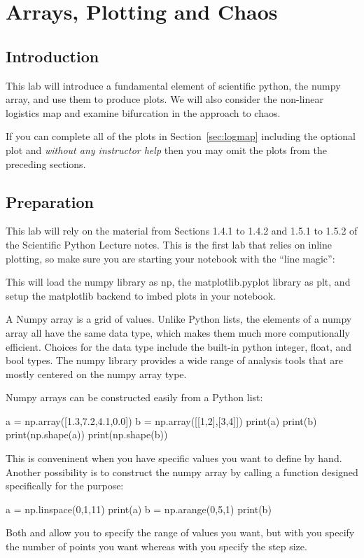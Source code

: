 \chapter{Arrays, Plotting and Chaos}

\section{Introduction}

This lab will introduce a fundamental element of scientific python,
the numpy array, and use them to produce plots.  We will also consider
the non-linear logistics map and examine bifurcation in the approach
to chaos.

If you can complete all of the plots in Section~\ref{sec:logmap}
including the optional plot and {\em without any instructor help} then
you may omit the plots from the preceding sections.

\section{Preparation}
\label{sec:arraysprep}

This lab will rely on the material from Sections 1.4.1 to 1.4.2 and
1.5.1 to 1.5.2 of the Scientific Python Lecture notes.  This is the
first lab that relies on inline plotting, so make sure you are
starting your notebook with the ``line magic'':
\begin{python}
\end{python}
This will load the numpy library as np, the matplotlib.pyplot library
as plt, and setup the matplotlib backend to imbed plots in your
notebook.

A Numpy array is a grid of values.  Unlike Python lists, the elements
of a numpy array all have the same data type, which makes them much
more computionally efficient.  Choices for the data type include the
built-in python integer, float, and bool types.  The numpy library
provides a wide range of analysis tools that are mostly centered on
the numpy array type.

Numpy arrays can be constructed easily from a Python list:
\begin{python}
a = np.array([1.3,7.2,4.1,0.0])
b = np.array([[1,2],[3,4]])
print(a)
print(b)
print(np.shape(a))
print(np.shape(b))
\end{python}
This is conveninent when you have specific values you want to define by hand.  Another possibility is to construct the numpy array by calling a function designed specifically for the purpose:
\begin{python}
a = np.linspace(0,1,11)
print(a)
b = np.arange(0,5,1)
print(b)
\end{python}
Both  and  allow you to specify the range
of values you want, but with  you specify the number of
points you want whereas with  you specify the step size.


